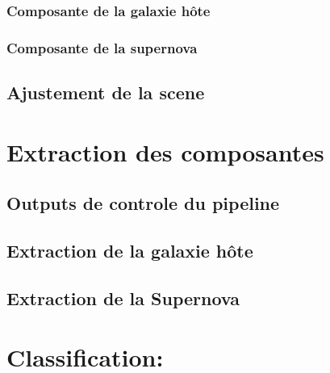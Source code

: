 \documentclass[../main/main.tex]{subfiles}
\begin{document}
\subsubsection{Composante de la galaxie hôte}

\subsubsection{Composante de la supernova}

\subsection{Ajustement de la scene}

\section{Extraction des composantes}

\subsection{Outputs de controle du pipeline}

\subsection{Extraction de la galaxie hôte}

\subsection{Extraction de la Supernova}

\section{Classification: }



\end{document}
